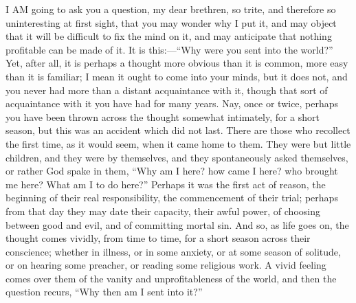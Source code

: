
I AM going to ask you a question, my dear brethren, so trite, and
therefore so uninteresting at first sight, that you may wonder why I
put it, and may object that it will be difficult to fix the mind on
it, and may anticipate that nothing profitable can be made of it. It
is this:—``Why were you sent into the world?'' Yet, after
all, it is perhaps a thought more obvious than it is common, more easy
than it is familiar; I mean it ought to come into your minds, but it
does not, and you never had more than a distant acquaintance with it,
though that sort of acquaintance with it you have had for many years.
Nay, once or twice, perhaps you have been thrown across the thought
somewhat intimately, for a short season, but this was an accident
which did not last. There are those who recollect the first time, as
it would seem, when it came home to them. They were but little
children, and they were by themselves, and they spontaneously asked
themselves, or rather God spake in them, ``Why am I here? how came
I here? who brought me here? What am I to do here?'' Perhaps it
was the first act of reason, the beginning of their real
responsibility, the commencement of their trial; perhaps from that day
they may date their capacity, their awful power, of choosing between
good and evil, and of committing mortal sin. And so, as life goes on,
the thought comes vividly, from time to time, for a short season
across their conscience; whether in illness, or in some anxiety, or at
some season of solitude, or on hearing some preacher, or reading some
religious work. A vivid feeling comes over them of the vanity and
unprofitableness of the world, and then the question recurs, ``Why
then am I sent into it?''

